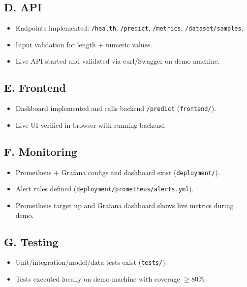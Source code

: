 \documentclass[11pt]{article}
\newcommand{\code}[1]{\texttt{#1}}
\newcommand{\checked}{\texttt{[x]}}
\newcommand{\unchecked}{\texttt{[ ]}}
\begin{document}
\subsection*{D. API}
\begin{itemize}
  \item[\checked] Endpoints implemented: \code{/health}, \code{/predict}, \code{/metrics}, \code{/dataset/samples}.
  \item[\checked] Input validation for length + numeric values.
  \item[\unchecked] Live API started and validated via curl/Swagger on demo machine.
\end{itemize}

\subsection*{E. Frontend}
\begin{itemize}
  \item[\checked] Dashboard implemented and calls backend \code{/predict} (\code{frontend/}).
  \item[\unchecked] Live UI verified in browser with running backend.
\end{itemize}

\subsection*{F. Monitoring}
\begin{itemize}
  \item[\checked] Prometheus + Grafana configs and dashboard exist (\code{deployment/}).
  \item[\checked] Alert rules defined (\code{deployment/prometheus/alerts.yml}).
  \item[\unchecked] Prometheus target up and Grafana dashboard shows live metrics during demo.
\end{itemize}

\subsection*{G. Testing}
\begin{itemize}
  \item[\checked] Unit/integration/model/data tests exist (\code{tests/}).
  \item[\unchecked] Tests executed locally on demo machine with coverage \(\ge 80\%\).
\end{itemize}
\end{document}
